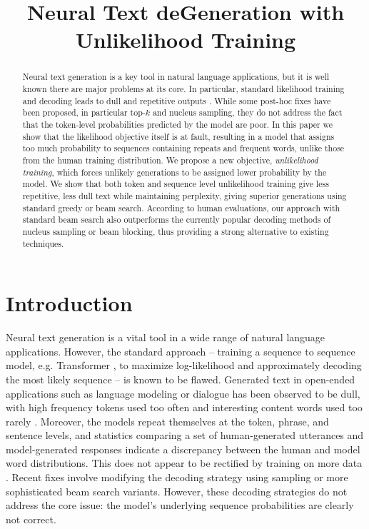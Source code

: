 \title{Neural Text deGeneration with Unlikelihood Training}

\begin{abstract}
Neural text generation is a key tool in natural language applications, but it is well known there are major problems at its core. In particular, standard likelihood training and decoding leads to dull and repetitive outputs \citep{holtzman2019curious}. While some post-hoc fixes have been proposed, in particular top-$k$ and nucleus sampling, they do not address the fact that the token-level probabilities predicted by the model are poor. In this paper we show that the likelihood objective itself is at fault, resulting in a  model that assigns too much probability to sequences containing repeats and frequent words, unlike those from the human training distribution. We propose a new objective, {\em unlikelihood training}, which forces unlikely generations to be assigned lower probability by the model. We show that both token and sequence level unlikelihood training give less repetitive, less dull text while maintaining perplexity, giving superior generations using standard greedy or beam search. According to human evaluations, our approach with standard beam search also outperforms the currently popular decoding methods of nucleus sampling or beam blocking, thus providing a strong alternative to existing techniques.
\end{abstract}

\section{Introduction}
\label{sec:intro}

Neural text generation is a vital  tool in a wide range of natural language applications. However, the standard approach -- training a sequence to sequence model, e.g. Transformer \citep{vaswani2017attention}, to maximize log-likelihood and approximately decoding the most likely sequence -- is known to be flawed. Generated text in open-ended applications such as language modeling or dialogue has been observed to be dull, with high frequency tokens used too often and interesting content words used too rarely \citep{holtzman2019curious,dinan2019second}. Moreover, the models repeat themselves at the token, phrase, and sentence levels, and statistics comparing a set of human-generated utterances and model-generated responses indicate a discrepancy between the human and model word distributions. This does not appear to be rectified by training on more data \citep{radford2019language}. Recent fixes involve modifying the decoding strategy using sampling or more sophisticated beam search variants. However, these decoding strategies do not address the core issue: the model's underlying sequence probabilities are clearly not correct.

